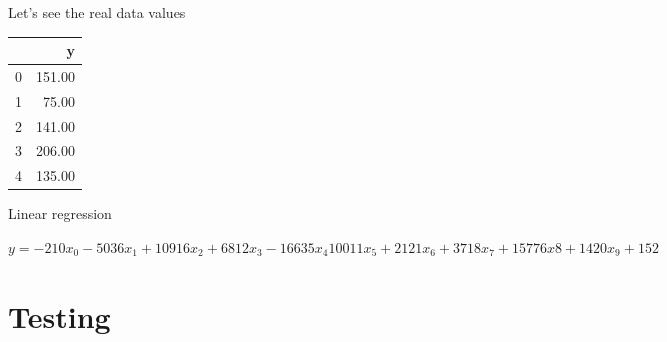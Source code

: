 \documentclass[obeyspaces,aspectratio=43]{beamer}
\begin{document}
\begin{frame}{Let's see the real data values}
\begin{tabular}{lr}
\toprule                                                                                                                                                                      
{} &  y \\                                                                                                                                                               
\midrule                                                                                                                                                                      
0 &  151.00 \\                                                                                                                                                                
1 &   75.00 \\                                                                                                                                                                
2 &  141.00 \\                                                                                                                                                                
3 &  206.00 \\                                                                                                                                                                
4 &  135.00 \\                                                                                                                                                                
\bottomrule                                                                                                                                                                   
\end{tabular}

\end{frame}

\begin{frame}{Linear regression}

\(y = -210x_0 -5036x_1 + 10916x_2 + 6812x_3  -16635x_4 10011x_5 + 2121x_6 + 3718x_7 +  15776x8 + 1420x_{9} + 152\)

\end{frame}

\section{Testing}\label{testing}
\end{document}

